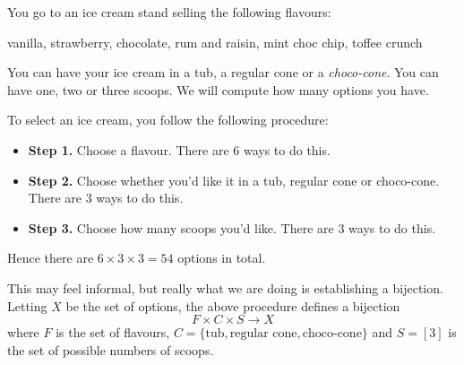 \begin{example}
You go to an ice cream stand selling the following flavours:
\begin{center} vanilla, strawberry, chocolate, rum and raisin, mint choc chip, toffee crunch \end{center}
You can have your ice cream in a tub, a regular cone or a \textit{choco-cone}. You can have one, two or three scoops. We will compute how many options you have.

To select an ice cream, you follow the following procedure:
\begin{itemize}
\item \textbf{Step 1.} Choose a flavour. There are $6$ ways to do this.
\item \textbf{Step 2.} Choose whether you'd like it in a tub, regular cone or choco-cone. There are $3$ ways to do this.
\item \textbf{Step 3.} Choose how many scoops you'd like. There are $3$ ways to do this.
\end{itemize}
Hence there are $6 \times 3 \times 3 = 54$ options in total.
\end{example}

This may feel informal, but really what we are doing is establishing a bijection. Letting $X$ be the set of options, the above procedure defines a bijection
\[ F \times C \times S \to X \]
where $F$ is the set of flavours, $C = \{ \text{tub}, \text{regular cone}, \text{choco-cone} \}$ and $S = [3]$ is the set of possible numbers of scoops.


